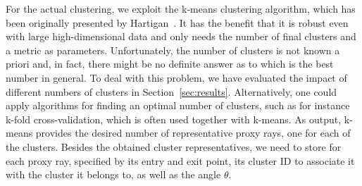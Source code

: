 \documentclass[journal]{vgtc}                %
\begin{document}
For the actual clustering, we exploit the k-means clustering algorithm, which has been originally presented by Hartigan~\cite{hartigan75kmeans}. It has the benefit that it is robust even with large high-dimensional data and only needs the number of final clusters and a metric as parameters. Unfortunately, the number of clusters is not known a priori and, in fact, there might be no definite answer as to which is the best number in general. To deal with this problem, we have evaluated the impact of different numbers of clusters in Section~\ref{sec:results}. Alternatively, one could apply algorithms for finding an optimal number of clusters, such as for instance k-fold cross-validation, which is often used together with k-means. As output, k-means provides the desired number of representative proxy rays, one for each of the clusters. Besides the obtained cluster representatives, we need to store for each proxy ray, specified by its entry and exit point, its cluster ID to associate it with the cluster it belongs to, as well as the angle $\theta$.
%
\end{document}
